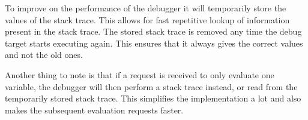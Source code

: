 To improve on the performance of the debugger it will temporarily store the values of the stack trace.
This allows for fast repetitive lookup of information present in the stack trace.
The stored stack trace is removed any time the debug target starts executing again.
This ensures that it always gives the correct values and not the old ones.


Another thing to note is that if a request is received to only evaluate one variable, the debugger will then perform a stack trace instead, or read from the temporarily stored stack trace.
This simplifies the implementation a lot and also makes the subsequent evaluation requests faster.

